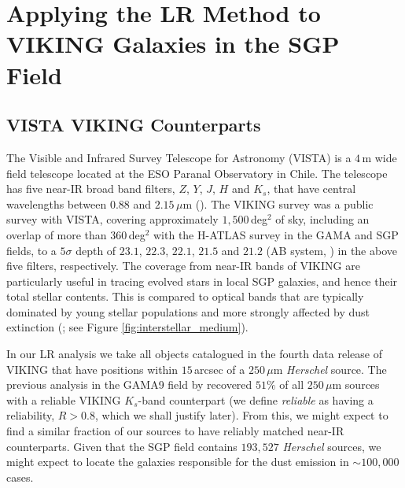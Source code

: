 \section{Applying the LR Method to VIKING Galaxies in the SGP Field}
\subsection{VISTA VIKING Counterparts}
\label{sec:star_galaxy_classifier}

The Visible and Infrared Survey Telescope for Astronomy (VISTA) is a $4\,$m wide field telescope located at the ESO Paranal Observatory in Chile. The telescope has five near-IR broad band filters, $Z$, $Y$, $J$, $H$ and $K_s$, that have central wavelengths between $0.88$ and $2.15\,\mu$m (\citealt{Emerson_2010}). The VIKING survey was a public survey with VISTA, covering approximately $1,500\,$deg$^2$ of sky, including an overlap of more than $360\,$deg$^2$ with the H-ATLAS survey in the GAMA and SGP fields, to a $5\sigma$ depth of $23.1$, $22.3$, $22.1$, $21.5$ and $21.2$ (AB system, \citealt{Edge_2013}) in the above five filters, respectively. The coverage from near-IR bands of VIKING are particularly useful in tracing evolved stars in local SGP galaxies, and hence their total stellar contents. This is compared to optical bands that are typically dominated by young stellar populations and more strongly affected by dust extinction (\citealt{Cole_2001}; see Figure \ref{fig:interstellar_medium}).

In our LR analysis we take all objects catalogued in the fourth data release of VIKING that have positions within $15\,$arcsec of a $250\,\mu$m \textit{Herschel} source. The previous analysis in the GAMA9 field by \citealt{Fleuren_2012} recovered $51\%$ of all $250\,\mu$m sources with a reliable VIKING $K_s$-band counterpart (we define \textit{reliable} as having a reliability, $R > 0.8$, which we shall justify later). From this, we might expect to find a similar fraction of our sources to have reliably matched near-IR counterparts. Given that the SGP field contains $193,527$ \textit{Herschel} sources, we might expect to locate the galaxies responsible for the dust emission in $\sim 100,000$ cases.

